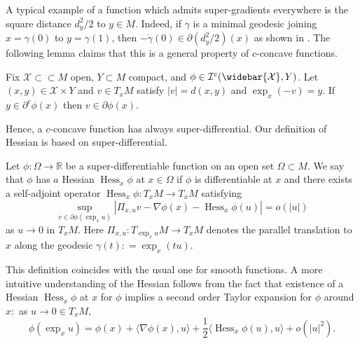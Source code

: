 A typical example of a function which admits super-gradients everywhere
is the square distance \( d _ { y } ^ { 2 } / 2 \) to \( y \in M \).
Indeed, if \( \gamma \) is a minimal geodesic
joining \( x = \gamma ( 0 ) \) to \( y = \gamma ( 1 ) \),
then \( - \dot { \gamma } ( 0 ) \in \partial \left( d _ { y } ^ { 2 } / 2 \right) ( x ) \)  as shown in \cite[Proposition 7]{mccann2001polar}.
The following lemma \cite[Lemma 3.7]{cordero2001riemannian} claims that
this is a general property of $c$-concave functions.

\begin{lem}
	\label{lem:c-super-gradients_imply_super-gradients}
	Fix \( \mathcal { X } \subset \subset M \) open,
	\( Y \subset M \) compact, and \( \phi \in \mathcal { I } ^ { c } ( \widebar { \mathcal{X} } , Y ) \).
	Let \( ( x , y ) \in \mathcal { X } \times Y \) and \( v \in T _ { x } M \) satisfy
	\( | v | = d ( x , y ) \) and \( \exp _ { x } ( - v ) = y\).
	If \( y \in \partial ^ { c } \phi ( x ) \) then
	\( v \in \partial \phi ( x ) \).
\end{lem}
Hence, a $c$-concave function has always super-differential.
Our definition of Hessian is based on super-differential.

\begin{defn}[Hessian]
	Let \( \phi : \Omega \rightarrow \mathbb { R } \) be a	super-differentiable function on an open set \( \Omega \subset M \).
	We say that \( \phi \) has \( a \) Hessian \( \operatorname{Hess}_x\phi \) at \( x \in \Omega \) if \( \phi \) is differentiable at \( x \)
	and there exists a self-adjoint operator \( \operatorname{Hess}_x \phi : T _ { x } M \rightarrow T _ { x } M \) satisfying
	\begin{equation}
		\label{defn:hessian}
		\sup _ { v \in \partial \phi \left( \exp _ { x } u \right) }
		\left| \Pi _ { x , u } v - \nabla \phi ( x ) - \operatorname{Hess}_x \phi (u) \right| = o ( | u | )
	\end{equation}
	as \( u \rightarrow 0 \) in \( T _ { x } M \).
	Here \( \Pi _ { x , u } : T _ { \exp _ { x } u } M \rightarrow T _ { x } M \) denotes the parallel translation to \( x \) along the geodesic \( \gamma ( t ) : = \exp _ { x } ( t u )\).
\end{defn}

This definition coincides with the usual one for smooth functions.
A more intuitive understanding of the Hessian follows from the fact that
existence of a Hessian \( \operatorname{Hess}_x \phi \) at \( x \) for \( \phi \) implies a second order Taylor expansion for \( \phi \) around \( x : \) as \( u \rightarrow 0 \in T _ { x } M \),
\begin{equation}
	\label{equa:hessian_expan}
	\phi \left( \exp _ { x } u \right) = \phi ( x ) + \langle \nabla \phi ( x ) , u \rangle +
	\frac { 1 } { 2 } \langle \operatorname{Hess}_x \phi (u) , u \rangle + o \left( | u | ^ { 2 } \right).
\end{equation}

